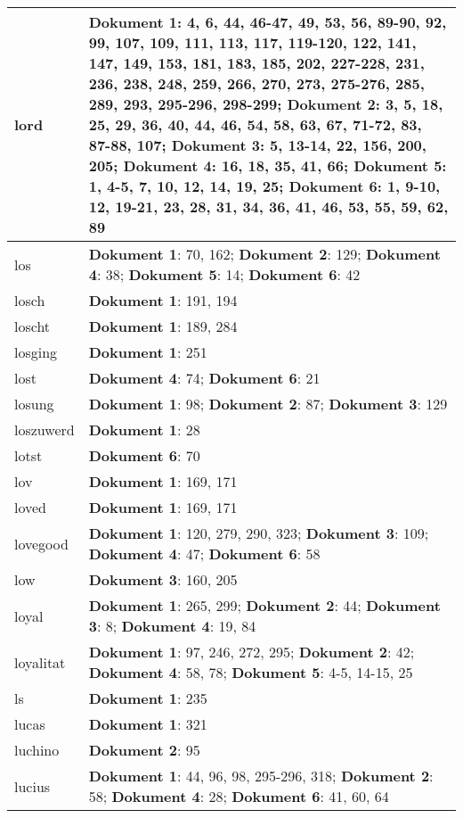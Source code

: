 \documentclass[a5paper]{article}
\begin{document}
\begin{longtable}[l]{|l|p{3in}|}
\hline
lord & \textbf{Dokument 1}: 4, 6, 44, 46-47, 49, 53, 56, 89-90, 92, 99, 107, 109, 111, 113, 117, 119-120, 122, 141, 147, 149, 153, 181, 183, 185, 202, 227-228, 231, 236, 238, 248, 259, 266, 270, 273, 275-276, 285, 289, 293, 295-296, 298-299; \textbf{Dokument 2}: 3, 5, 18, 25, 29, 36, 40, 44, 46, 54, 58, 63, 67, 71-72, 83, 87-88, 107; \textbf{Dokument 3}: 5, 13-14, 22, 156, 200, 205; \textbf{Dokument 4}: 16, 18, 35, 41, 66; \textbf{Dokument 5}: 1, 4-5, 7, 10, 12, 14, 19, 25; \textbf{Dokument 6}: 1, 9-10, 12, 19-21, 23, 28, 31, 34, 36, 41, 46, 53, 55, 59, 62, 89 \\
\hline
los & \textbf{Dokument 1}: 70, 162; \textbf{Dokument 2}: 129; \textbf{Dokument 4}: 38; \textbf{Dokument 5}: 14; \textbf{Dokument 6}: 42 \\
\hline
losch & \textbf{Dokument 1}: 191, 194 \\
\hline
loscht & \textbf{Dokument 1}: 189, 284 \\
\hline
losging & \textbf{Dokument 1}: 251 \\
\hline
lost & \textbf{Dokument 4}: 74; \textbf{Dokument 6}: 21 \\
\hline
losung & \textbf{Dokument 1}: 98; \textbf{Dokument 2}: 87; \textbf{Dokument 3}: 129 \\
\hline
loszuwerd & \textbf{Dokument 1}: 28 \\
\hline
lotst & \textbf{Dokument 6}: 70 \\
\hline
lov & \textbf{Dokument 1}: 169, 171 \\
\hline
loved & \textbf{Dokument 1}: 169, 171 \\
\hline
lovegood & \textbf{Dokument 1}: 120, 279, 290, 323; \textbf{Dokument 3}: 109; \textbf{Dokument 4}: 47; \textbf{Dokument 6}: 58 \\
\hline
low & \textbf{Dokument 3}: 160, 205 \\
\hline
loyal & \textbf{Dokument 1}: 265, 299; \textbf{Dokument 2}: 44; \textbf{Dokument 3}: 8; \textbf{Dokument 4}: 19, 84 \\
\hline
loyalitat & \textbf{Dokument 1}: 97, 246, 272, 295; \textbf{Dokument 2}: 42; \textbf{Dokument 4}: 58, 78; \textbf{Dokument 5}: 4-5, 14-15, 25 \\
\hline
ls & \textbf{Dokument 1}: 235 \\
\hline
lucas & \textbf{Dokument 1}: 321 \\
\hline
luchino & \textbf{Dokument 2}: 95 \\
\hline
lucius & \textbf{Dokument 1}: 44, 96, 98, 295-296, 318; \textbf{Dokument 2}: 58; \textbf{Dokument 4}: 28; \textbf{Dokument 6}: 41, 60, 64 \\

\end{longtable}
\end{document}
